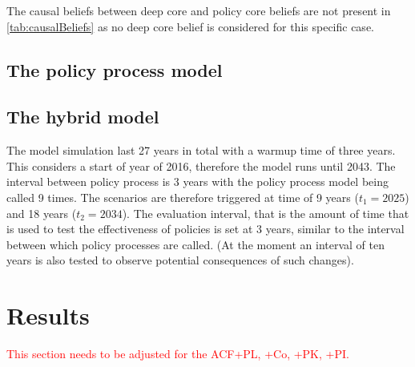 \documentclass[12pt]{article}
\begin{document}
The causal beliefs between deep core and policy core beliefs are not present in \autoref{tab:causalBeliefs} as no deep core belief is considered for this specific case.


\subsection{The policy process model}




\subsection{The hybrid model}

The model simulation last 27 years in total with a warmup time of three years. This considers a start of year of 2016, therefore the model runs until 2043. The interval between policy process is 3 years with the policy process model being called 9 times. The scenarios are therefore triggered at time of 9 years ($t_1 = 2025$) and 18 years ($t_2 = 2034$). The evaluation interval, that is the amount of time that is used to test the effectiveness of policies is set at 3 years, similar to the interval between which policy processes are called. (At the moment an interval of ten years is also tested to observe potential consequences of such changes).



\section{Results}
\label{sec:}

\textcolor{red}{This section needs to be adjusted for the ACF+PL, +Co, +PK, +PI.}

 


\appendix
\end{document}
